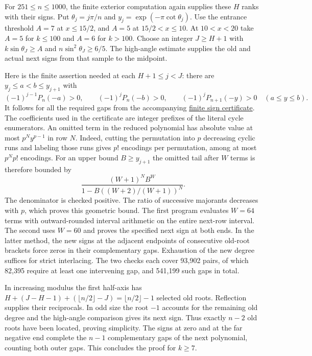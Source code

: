 For $251\le n\le1000$, the finite exterior computation again supplies
these $H$ ranks with their signs. Put $\theta_j=j\pi/n$ and
$y_j=\exp(-\pi\cot\theta_j)$. Use the entrance threshold $A=7$
at $x\le15/2$, and $A=5$ at $15/2<x\le10$. At $10<x<20$ take
$A=5$ for $k\le100$ and $A=6$ for $k>100$. Choose an integer
$J\ge H+1$ with $k\sin\theta_J\ge A$ and
$n\sin^2\theta_J\ge6/5$. The high-angle estimate supplies the old and
actual next signs from that sample to the midpoint.

Here is the finite assertion needed at each $H+1\le j<J$: there
are $y_j\le a<b\le y_{j+1}$ with
\[
 (-1)^{j-1}P_n(-a)>0,\qquad (-1)^j P_n(-b)>0,\qquad
 (-1)^j P_{n+1}(-y)>0\quad(a\le y\le b).
\]
It follows for all the required gaps from the accompanying
\href{https://github.com/ProgramComputer/open-math-research/tree/research/topics/long-cycle-excedances/intermediate}{finite sign certificate}.
The coefficients used in the certificate are integer prefixes of the literal
cycle enumerators. An omitted term in the reduced polynomial has
absolute value at most $p^N y^{p-1}$ in row $N$. Indeed, cutting the
permutation into $p$ decreasing cyclic runs and labeling those runs gives
$p!$ encodings per permutation, among at most $p^N p!$ encodings.
For an upper bound $B\ge y_{j+1}$ the omitted tail after $W$ terms
is therefore bounded by
\[
 \frac{(W+1)^N B^W}{1-B((W+2)/(W+1))^N}.
\]
The denominator is checked positive. The ratio of successive majorants
decreases with $p$, which proves this geometric bound. The first program
evaluates $W=64$ terms with outward-rounded interval arithmetic on the
entire next-row interval. The second uses $W=60$ and proves the specified
next sign at both ends. In the latter method, the new signs at the adjacent
endpoints of consecutive old-root brackets force zeros in their
complementary gaps. Exhaustion of the new degree suffices for strict
interlacing. The two checks each cover 93,902 pairs, of which 82,395
require at least one intervening gap, and 541,199 such gaps in total.

In increasing modulus the first half-axis has
$H+(J-H-1)+(\lfloor n/2\rfloor-J)=\lfloor n/2\rfloor-1$
selected old roots. Reflection supplies their reciprocals. In odd size the
root $-1$ accounts for the remaining old degree and the high-angle
comparison gives its next sign. Thus exactly $n-2$ old roots have been
located, proving simplicity. The signs at zero and at the far negative
end complete the $n-1$ complementary gaps of the next polynomial, counting
both outer gaps. This concludes the proof for $k\ge7$.
